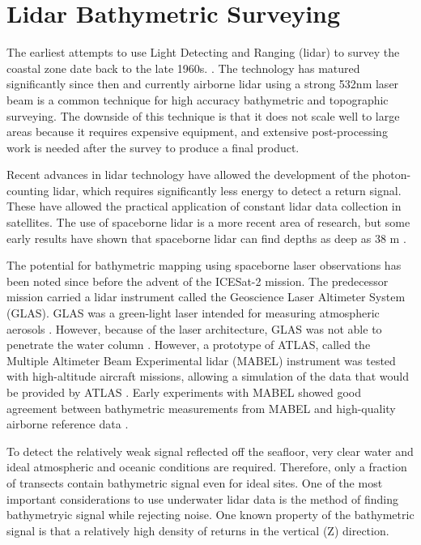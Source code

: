 \section{Lidar Bathymetric Surveying}

The earliest attempts to use Light Detecting and Ranging (lidar) to survey the coastal zone date back to the late 1960s. \parencite{Bailly2016}. The technology has matured significantly since then and currently airborne lidar using a strong 532nm laser beam is a common technique for high accuracy bathymetric and topographic surveying. The downside of this technique is that it does not scale well to large areas because it requires expensive equipment, and extensive post-processing work is needed after the survey to produce a final product. 

Recent advances in lidar technology have allowed the development of the photon-counting lidar, which requires significantly less energy to detect a return signal. These have allowed the practical application of constant lidar data collection in satellites. The use of spaceborne lidar is a more recent area of research, but some early results have shown that spaceborne lidar can find depths as deep as 38 m \parencite{Parrish2019}.

The potential for bathymetric mapping using spaceborne laser observations has been noted since before the advent of the ICESat-2 mission. The predecessor mission carried a lidar instrument called the Geoscience Laser Altimeter System (GLAS). GLAS was a green-light laser intended for measuring atmospheric aerosols \parencite{Abshire2005}. However, because of the laser architecture, GLAS was not able to penetrate the water column \parencite{Forfinski-Sarkozi2016}. However, a prototype of ATLAS, called the Multiple Altimeter Beam Experimental lidar (MABEL) instrument was tested with high-altitude aircraft missions, allowing a simulation of the data that would be provided by ATLAS \parencite{Mcgill2013}. Early experiments with MABEL showed good agreement between bathymetric measurements from MABEL and high-quality airborne reference data \parencite{Jasinski2016,Forfinski-Sarkozi2016}.

To detect the relatively weak signal reflected off the seafloor, very clear water and ideal atmospheric and oceanic conditions are required. Therefore, only a fraction of transects contain bathymetric signal even for ideal sites. One of the most important considerations to use underwater lidar data is the method of finding bathymetryic signal while rejecting noise. One known property of the bathymetric signal is that a relatively high density of returns in the vertical (Z) direction. 

